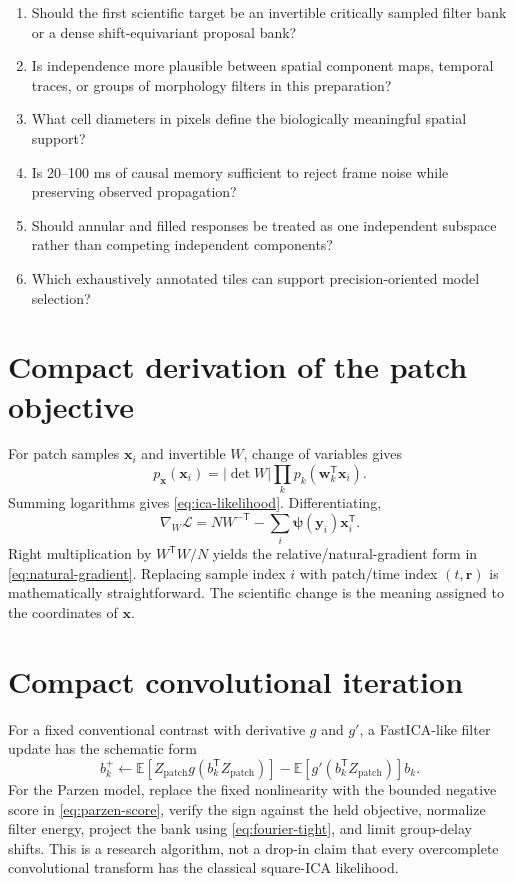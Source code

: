 \documentclass[11pt]{article}
\newcommand{\E}{\mathbb{E}}
\newcommand{\trans}{\mathsf T}
\begin{document}
\begin{enumerate}[leftmargin=*]
\item Should the first scientific target be an invertible critically sampled
filter bank or a dense shift-equivariant proposal bank?
\item Is independence more plausible between spatial component maps, temporal
traces, or groups of morphology filters in this preparation?
\item What cell diameters in pixels define the biologically meaningful spatial
support?
\item Is 20--100 ms of causal memory sufficient to reject frame noise while
preserving observed propagation?
\item Should annular and filled responses be treated as one independent
subspace rather than competing independent components?
\item Which exhaustively annotated tiles can support precision-oriented model
selection?
\end{enumerate}

\appendix
\section{Compact derivation of the patch objective}

For patch samples $\bm x_i$ and invertible $W$, change of variables gives
\begin{equation}
p_{\bm x}(\bm x_i)
=
|\det W|
\prod_k p_k(\bm w_k^{\trans}\bm x_i).
\end{equation}
Summing logarithms gives \cref{eq:ica-likelihood}. Differentiating,
\begin{equation}
\nabla_W\mathcal L
=
NW^{-\trans}
-
\sum_i
\bm\psi(\bm y_i)\bm x_i^{\trans}.
\end{equation}
Right multiplication by $W^{\trans}W/N$ yields the relative/natural-gradient
form in \cref{eq:natural-gradient}. Replacing sample index $i$ with patch/time
index $(t,\bm r)$ is mathematically straightforward. The scientific change is
the meaning assigned to the coordinates of $\bm x$.

\section{Compact convolutional iteration}

For a fixed conventional contrast with derivative $g$ and $g'$, a
FastICA-like filter update has the schematic form
\begin{equation}
b_k^+
\leftarrow
\E\!\left[
Z_{\mathrm{patch}}g(b_k^{\trans}Z_{\mathrm{patch}})
\right]
-
\E\!\left[
g'(b_k^{\trans}Z_{\mathrm{patch}})
\right]b_k.
\end{equation}
For the Parzen model, replace the fixed nonlinearity with the bounded negative
score in \cref{eq:parzen-score}, verify the sign against the held objective,
normalize filter energy, project the bank using
\cref{eq:fourier-tight}, and limit group-delay shifts. This is a research
algorithm, not a drop-in claim that every overcomplete convolutional transform
has the classical square-ICA likelihood.
\end{document}
